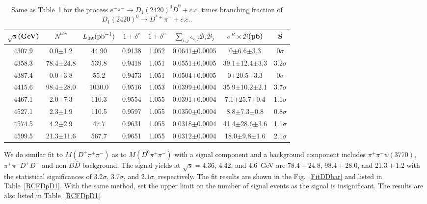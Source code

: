 \documentclass[aps,preprint,superscriptaddress,12pt,tightenlines]{revtex4}
\newcommand{\pp}{\pi^+\pi^-}
\begin{document}
\begin{table}[htbp]
\caption{Same as Table~\ref{RCFD0starD1} for the process $e^{+}e^{-}\to
D_{1}(2420)^{0}\bar{D}^{0}+c.c.$ times branching fraction of $D_{1}(2420)^{0}\rightarrow D^{*+}\pi^{-}+c.c.$.}
\label{RCFD0starD1}
\begin{tabular}{c c c c c c c c}
\hline \hline
    $\sqrt{s}$(GeV)      &$N^{obs}$ &$L_{\rm int}({\rm pb}^{-1})$  &$1+\delta^{r}$  &$1+\delta^{v}$  &$\sum_{i,j}\epsilon_{i,j} \mathcal{B}_{i}\mathcal{B}_{j}$     &$\sigma^{B}\times\mathcal{B}$(pb) &S\\
    \hline
     4307.9&      0.0$\pm$1.2   &44.90   &0.9138  &1.052  &0.0641$\pm$0.0005   &0$\pm$6.6$\pm$3.3      & 0$\sigma$ \\
     4358.3&      78.4$\pm$24.8 &539.8   &0.9418  &1.051  &0.0551$\pm$0.0005   &39.1$\pm$12.4$\pm$3.3  & 3.2$\sigma$ \\
     4387.4&      0.0$\pm$3.8   &55.2    &0.9473  &1.051  &0.0504$\pm$0.0005   &0$\pm$20.5$\pm$3.3     & 0$\sigma$ \\
     4415.6&      98.4$\pm$28.0 &1030.0  &0.9516  &1.053  &0.0399$\pm$0.0004   &35.9$\pm$10.2$\pm$2.1  & 3.7$\sigma$ \\
     4467.1&      2.0$\pm$7.3   &110.3   &0.9554  &1.055  &0.0391$\pm$0.0004   &7.1$\pm$25.7$\pm$0.4   & 1.1$\sigma$\\
     4527.1&      2.3$\pm$1.9   &110.5   &0.9597  &1.055  &0.0350$\pm$0.0004   &8.8$\pm$7.3$\pm$0.8    & 0.8$\sigma$ \\
     4574.5&      4.2$\pm$2.9   &47.7    &0.9631  &1.055  &0.0318$\pm$0.0004   &41.4$\pm$28.6$\pm$3.6  & 1.1$\sigma$ \\
     4599.5&      21.3$\pm$11.6 &567.7   &0.9651  &1.055  &0.0312$\pm$0.0004   &18.0$\pm$9.8$\pm$1.6   & 2.1$\sigma$ \\
    \hline \hline
\end{tabular}
\end{table}


We do similar fit to $M(D^+\pp)$ as to $M(D^0\pp)$ with a signal
component and a background component includes
$\pi^{+}\pi^{-}\psi(3770)$, $\pi^{+}\pi^{-} D^{+}D^{-}$  and non-$D\bar{D}$ background. The
signal yields at $\sqrt{s} = 4.36$, 4.42, and 4.6~GeV are $78.4\pm
24.8$, $98.4\pm 28.0$, and $21.3\pm 1.2$ with the statistical
significances of $3.2\sigma$, $3.7\sigma$, and $2.1\sigma$,
respectively.  The fit results are shown in the
Fig.~\ref{FitDDbar} and listed in Table~\ref{RCFDpD1}.  With the
same method, set the upper limit on the number of signal events as
the signal is insignificant. The results are also listed in
Table~\ref{RCFDpD1}.
\end{document}
